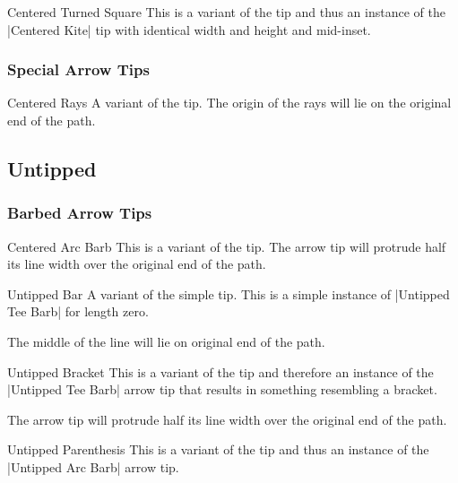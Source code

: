 \begin{multicols}{2}
\begin{arrowtipsimple}{Centered Turned Square}
    This is a variant of the  tip and
    thus an instance of the |Centered Kite| tip with identical width and height and mid-inset.
\end{arrowtipsimple}

\subsubsection{Special Arrow Tips}
\begin{arrowtipsimple}{Centered Rays}
    A variant of the  tip.
    The origin of the rays will lie on the original end of the path.
\end{arrowtipsimple}

\subsection{Untipped}
\subsubsection{Barbed Arrow Tips}
\begin{arrowtipsimple}{Centered Arc Barb}
    This is a variant of the  tip.
    The arrow tip will protrude half its line width over the original end of the path.
\end{arrowtipsimple}

\begin{arrowtipsimple}{Untipped Bar}
    A variant of the simple  tip.
    This is a simple instance of |Untipped Tee Barb| for length zero.
    
    The middle of the line will lie on original end of the path.
\end{arrowtipsimple}

\begin{arrowtipsimple}{Untipped Bracket}
    This is a variant of the  tip and
    therefore an instance of the |Untipped Tee Barb| arrow tip that results in something
    resembling a bracket.
    
    The arrow tip will protrude half its line width over the original end of the path.
\end{arrowtipsimple}

\begin{arrowtipsimple}{Untipped Parenthesis}
    This is a variant of the  tip and
    thus an instance of the |Untipped Arc Barb| arrow tip.
\end{arrowtipsimple}


\end{multicols}
